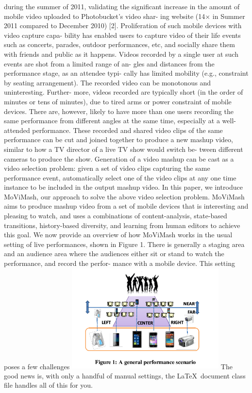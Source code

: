 \documentclass{sig-alternate}
\begin{document}
	during the summer of 2011, validating the significant increase in
	the amount of mobile video uploaded to Photobucket’s video shar-
	ing website (14× in Summer 2011 compared to December 2010) [2].
	Proliferation of such mobile devices with video capture capa-
	bility has enabled users to capture video of their life events such
	as concerts, parades, outdoor performances, etc, and socially share
	them with friends and public as it happens. Videos recorded by
	a single user at such events are shot from a limited range of an-
	gles and distances from the performance stage, as an attendee typi-
	cally has limited mobility (e.g., constraint by seating arrangement).
	The recorded video can be monotonous and uninteresting. Further-
	more, videos recorded are typically short (in the order of minutes
	or tens of minutes), due to tired arms or power constraint of mobile
	devices. There are, however, likely to have more than one users
	recording the same performance from different angles at the same
	time, especially at a well-attended performance.
	These recorded and shared video clips of the same performance
	can be cut and joined together to produce a new mashup video,
	similar to how a TV director of a live TV show would switch be-
	tween different cameras to produce the show. Generation of a video
	mashup can be cast as a video selection problem: given a set of
	video clips capturing the same performance event, automatically
	select one of the video clips at any one time instance to be included
	in the output mashup video.
	In this paper, we introduce MoViMash, our approach to solve
	the above video selection problem. MoViMash aims to produce
	mashup video from a set of mobile devices that is interesting and
	pleasing to watch, and uses a combinations of content-analysis,
	state-based transitions, history-based diversity, and learning from
	human editors to achieve this goal.
	We now provide an overview of how MoViMash works in the
	usual setting of live performances, shown in Figure 1. There is
	generally a staging area and an audience area where the audiences
	either sit or stand to watch the performance, and record the perfor-
	mance with a mobile device. This setting poses a few challenges 
	\includegraphics[width=8cm]{1.png}
	The good news is, with only a handful of manual
	settings, the \LaTeX\ document
	class file handles all of this for you.
	
\end{document}
